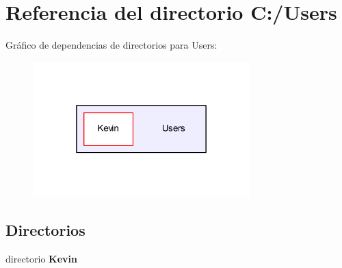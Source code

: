 \section{Referencia del directorio C\-:/\-Users}
\label{dir_d522931ffa1371640980b621734a4381}
Gráfico de dependencias de directorios para Users\-:\nopagebreak
\begin{figure}[H]
\begin{center}
\leavevmode
\includegraphics[width=238pt]{dir_d522931ffa1371640980b621734a4381_dep}
\end{center}
\end{figure}
\subsection*{Directorios}
\begin{DoxyCompactItemize}
\item 
directorio {\bf Kevin}
\end{DoxyCompactItemize}

